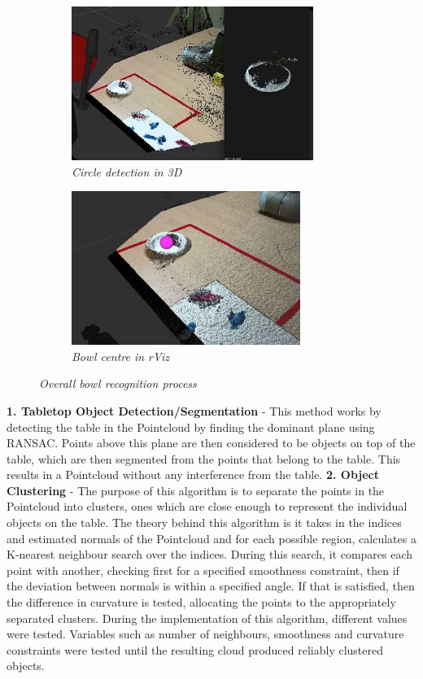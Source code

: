 \begin{figure}[ht!]
    \begin{subfigure}[b]{0.475\textwidth}   
        \centering 
        \includegraphics[width=\textwidth, height=5cm]{whitecloud.jpg}
        \caption{\textit{Circle detection in 3D}}
    \end{subfigure}
    \quad
    \begin{subfigure}[b]{0.475\textwidth}   
        \centering 
        \includegraphics[width=\textwidth, height=5cm]{bowlcentre.jpg}
        \caption{\textit{Bowl centre in rViz}}
    \end{subfigure}
    \caption{\textit{Overall bowl recognition process}}
\end{figure}
\newline\newline
\textbf{1. Tabletop Object Detection/Segmentation} - 
This method works by detecting the table in the Pointcloud by finding the dominant plane using RANSAC. Points above this plane are then considered to be objects on top of the table, which are then segmented from the points that belong to the table. This results in a Pointcloud without any interference from the table.
\newline\newline
\textbf{2. Object Clustering} - 
The purpose of this algorithm is to separate the points in the Pointcloud into clusters, ones which are close enough to represent the individual objects on the table. The theory behind this algorithm is it takes in the indices and estimated normals of the Pointcloud and for each possible region, calculates a K-nearest neighbour search over the indices. During this search, it compares each point with another, checking first for a specified smoothness constraint, then if the deviation between normals is within a specified angle. If that is satisfied, then the difference in curvature is tested, allocating the points to the appropriately separated clusters. During the implementation of this algorithm, different values were tested. Variables such as number of neighbours, smoothness and curvature constraints were tested until the resulting cloud produced reliably clustered objects.
